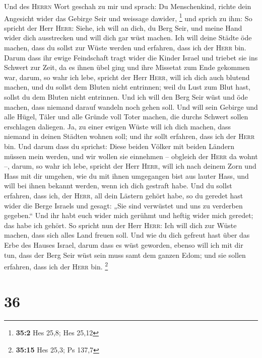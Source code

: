  Und des \textsc{Herrn} Wort geschah zu mir und sprach:
 Du Menschenkind, richte dein Angesicht wider das Gebirge
Seir und weissage dawider, \footnote{\textbf{35:2} Hes 25,8; Hes 25,12}
 und sprich zu ihm: So spricht der Herr \textsc{Herr}:
Siehe, ich will an dich, du Berg Seir, und meine Hand wider dich
ausstrecken und will dich gar wüst machen.  Ich will deine
Städte öde machen, dass du sollst zur Wüste werden und erfahren, dass
ich der \textsc{Herr} bin.  Darum dass ihr ewige
Feindschaft tragt wider die Kinder Israel und triebet sie ins Schwert
zur Zeit, da es ihnen übel ging und ihre Missetat zum Ende gekommen war,
 darum, so wahr ich lebe, spricht der Herr \textsc{Herr},
will ich dich auch blutend machen, und du sollst dem Bluten nicht
entrinnen; weil du Lust zum Blut hast, sollst du dem Bluten nicht
entrinnen.  Und ich will den Berg Seir wüst und öde
machen, dass niemand darauf wandeln noch gehen soll.  Und
will sein Gebirge und alle Hügel, Täler und alle Gründe voll Toter
machen, die durchs Schwert sollen erschlagen daliegen. 
Ja, zu einer ewigen Wüste will ich dich machen, dass niemand in deinen
Städten wohnen soll; und ihr sollt erfahren, dass ich der \textsc{Herr}
bin.  Und darum dass du sprichst: Diese beiden Völker mit
beiden Ländern müssen mein werden, und wir wollen sie einnehmen --
obgleich der \textsc{Herr} da wohnt --,  darum, so wahr
ich lebe, spricht der Herr \textsc{Herr}, will ich nach deinem Zorn und
Hass mit dir umgehen, wie du mit ihnen umgegangen bist aus lauter Hass,
und will bei ihnen bekannt werden, wenn ich dich gestraft habe.
 Und du sollst erfahren, dass ich, der \textsc{Herr}, all
dein Lästern gehört habe, so du geredet hast wider die Berge Israels und
gesagt: „Sie sind verwüstet und uns zu verderben gegeben.``
 Und ihr habt euch wider mich gerühmt und heftig wider
mich geredet; das habe ich gehört.  So spricht nun der
Herr \textsc{Herr}: Ich will dich zur Wüste machen, dass sich alles Land
freuen soll.  Und wie du dich gefreut hast über das Erbe
des Hauses Israel, darum dass es wüst geworden, ebenso will ich mit dir
tun, dass der Berg Seir wüst sein muss samt dem ganzen Edom; und sie
sollen erfahren, dass ich der \textsc{Herr} bin. \footnote{\textbf{35:15}
  Hes 25,3; Ps 137,7}

\hypertarget{section-10}{%
\section{36}\label{section-10}}

